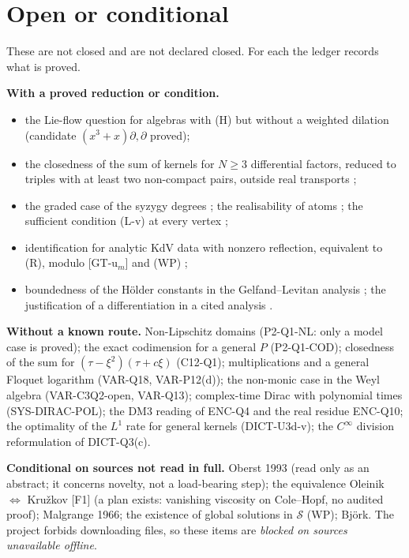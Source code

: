 \section{Open or conditional}

These are not closed and are not declared closed. For each the ledger records what is proved.

\textbf{With a proved reduction or condition.}
\begin{itemize}
\item the Lie-flow question for algebras with (H) but without a weighted dilation \openq{}  (candidate $(x^3+x)\partial,\partial$ proved);
\item the closedness of the sum of kernels for $N\ge3$ differential factors, reduced to triples with at least two non-compact pairs, outside real transports \openq{} ;
\item the graded case of the syzygy degrees \openq{} ; the realisability of atoms \openq{} ; the sufficient condition (L-v) at every vertex \openq{} ;
\item identification for analytic KdV data with nonzero reflection, equivalent to (R), modulo [GT-u$_m$] and (WP) \openq{} ;
\item boundedness of the H\"older constants in the Gelfand--Levitan analysis \openq{} \led{[GT-u$_0$]}; the justification of a differentiation in a cited analysis \openq{} \led{[GT-u$_m$]}.
\end{itemize}

\textbf{Without a known route.} Non-Lipschitz domains (P2-Q1-NL: only a model case is proved); the exact codimension for a general $P$ (P2-Q1-COD); closedness of the sum for $(\tau-\xi^2)(\tau+c\xi)$ (C12-Q1); multiplications and a general Floquet logarithm (VAR-Q18, VAR-P12(d)); the non-monic case in the Weyl algebra (VAR-C3Q2-open, VAR-Q13); complex-time Dirac with polynomial times (SYS-DIRAC-POL); the DM3 reading of ENC-Q4 and the real residue ENC-Q10; the optimality of the $L^1$ rate for general kernels (DICT-U3d-v); the $C^\infty$ division reformulation of DICT-Q3(c).

\textbf{Conditional on sources not read in full.} Oberst 1993 (read only as an abstract; it concerns novelty, not a load-bearing step); the equivalence Oleinik $\Leftrightarrow$ Kru\v zkov [F1] (a plan exists: vanishing viscosity on Cole--Hopf, no audited proof); Malgrange 1966; the existence of global solutions in $\mathcal S$ (WP); Bj\"ork. The project forbids downloading files, so these items are \emph{blocked on sources unavailable offline}.

